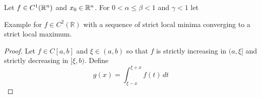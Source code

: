 \begin{algorithm}\label{algo:golden_section_search}
\end{algorithm}
\inputminted[fontsize=\small, framesep=0.35cm, frame=lines, python3=true]{python}{golden_section.py}
\bigskip

\begin{algorithm}\label{algo:steepest_descent}
\end{algorithm}
Let \( f \in C^1(\mathbb{R}^n) \) and \( x_0 \in \mathbb{R}^n \). For \( 0 < \alpha \le \beta < 1 \) and \( \gamma < 1 \) let



\begin{exercise}
Example for \( f \in C^2(\mathbb{R}) \) with a sequence of strict local minima converging to a strict local maximum.
\end{exercise}

\begin{proof}
Let \( f \in C[a,b] \) and \( \xi \in (a, b) \) so that \( f \) is strictly increasing in \( (a,\xi] \) and
strictly decreasing in \( [\xi,b) \). Define
\[
    g(x) = \int_{\xi - x}^{\xi + x} f(t)\,dt
\]
\end{proof}

